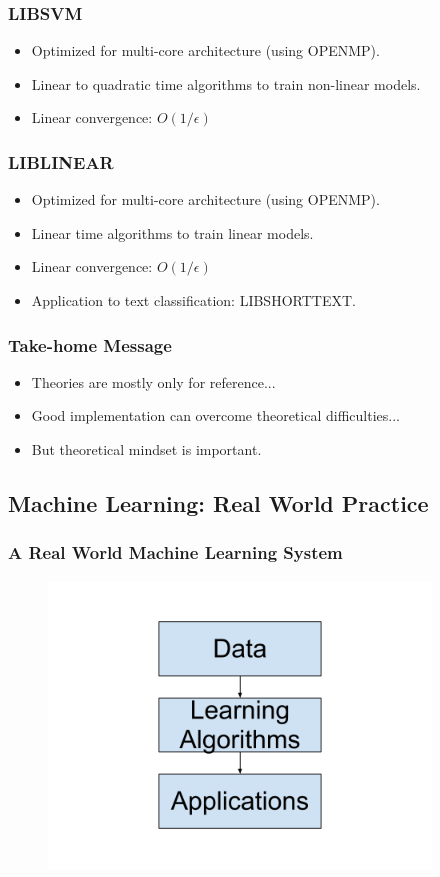 \documentclass{beamer}
\begin{document}
\begin{frame}
\frametitle{LIBSVM}
\begin{itemize}
\item Optimized for multi-core architecture (using OPENMP). 
\item Linear to quadratic time algorithms to train non-linear models.
\item Linear convergence: $O(1/\epsilon)$
\end{itemize}
\end{frame}

\begin{frame}
\frametitle{LIBLINEAR}
\begin{itemize}
\item Optimized for multi-core architecture (using OPENMP). 
\item Linear time algorithms to train linear models.
\item Linear convergence: $O(1/\epsilon)$
\item Application to text classification: LIBSHORTTEXT.
\end{itemize}
\end{frame}

\begin{frame}
\frametitle{Take-home Message}
\begin{itemize}
\item Theories are mostly only for reference...
\item Good implementation can overcome theoretical difficulties...
\item But theoretical mindset is important.
\end{itemize}
\end{frame}

\subsection{Machine Learning: Real World Practice}
\begin{frame}
  \frametitle{A Real World Machine Learning System}
  \begin{figure}
  \includegraphics[width=4in]{Framework.png}\\
  \end{figure}
\end{frame}
\end{document}
